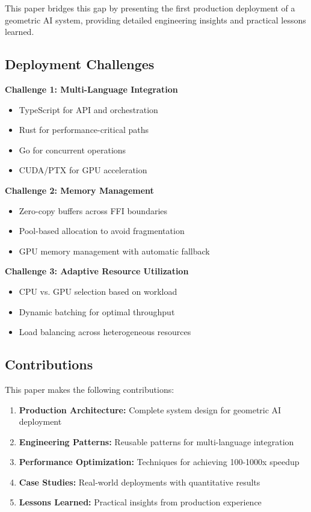 \documentclass{article}
\begin{document}
This paper bridges this gap by presenting the first production deployment of a geometric AI system, providing detailed engineering insights and practical lessons learned.

\subsection{Deployment Challenges}

\textbf{Challenge 1: Multi-Language Integration}
\begin{itemize}
    \item TypeScript for API and orchestration
    \item Rust for performance-critical paths
    \item Go for concurrent operations
    \item CUDA/PTX for GPU acceleration
\end{itemize}

\textbf{Challenge 2: Memory Management}
\begin{itemize}
    \item Zero-copy buffers across FFI boundaries
    \item Pool-based allocation to avoid fragmentation
    \item GPU memory management with automatic fallback
\end{itemize}

\textbf{Challenge 3: Adaptive Resource Utilization}
\begin{itemize}
    \item CPU vs. GPU selection based on workload
    \item Dynamic batching for optimal throughput
    \item Load balancing across heterogeneous resources
\end{itemize}

\subsection{Contributions}

This paper makes the following contributions:

\begin{enumerate}
    \item \textbf{Production Architecture:} Complete system design for geometric AI deployment
    \item \textbf{Engineering Patterns:} Reusable patterns for multi-language integration
    \item \textbf{Performance Optimization:} Techniques for achieving 100-1000x speedup
    \item \textbf{Case Studies:} Real-world deployments with quantitative results
    \item \textbf{Lessons Learned:} Practical insights from production experience
\end{enumerate}
\end{document}
